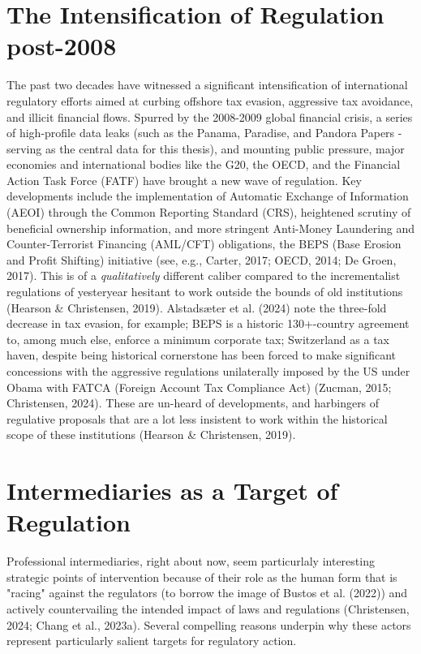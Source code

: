 \section{The Intensification of Regulation post-2008}
\label{sec:1_3}

The past two decades have witnessed a significant intensification of international regulatory efforts aimed at curbing offshore tax evasion, aggressive tax avoidance, and illicit financial flows. Spurred by the 2008-2009 global financial crisis, a series of high-profile data leaks (such as the Panama, Paradise, and Pandora Papers - serving as the central data for this thesis), and mounting public pressure, major economies and international bodies like the G20, the OECD, and the Financial Action Task Force (FATF) have brought a new wave of regulation.
Key developments include the implementation of Automatic Exchange of Information (AEOI) through the Common Reporting Standard (CRS), heightened scrutiny of beneficial ownership information, and more stringent Anti-Money Laundering and Counter-Terrorist Financing (AML/CFT) obligations, the BEPS (Base Erosion and Profit Shifting) initiative (see, e.g., Carter, 2017; OECD, 2014; De Groen, 2017). This is of a \textit{qualitatively} different caliber compared to the incrementalist regulations of yesteryear hesitant to work outside the bounds of old institutions (Hearson \& Christensen, 2019).  Alstadsæter et al. (2024) note the three-fold decrease in tax evasion, for example; BEPS is a historic 130+-country agreement to, among much else, enforce a minimum corporate tax; Switzerland as a tax haven, despite being historical cornerstone  has been forced to make significant concessions with the aggressive regulations unilaterally imposed by the US under Obama with FATCA (Foreign Account Tax Compliance Act) (Zucman, 2015; Christensen, 2024). These are un-heard of developments, and harbingers of regulative proposals that are a lot less insistent to work within the historical scope of these institutions (Hearson \& Christensen, 2019).

\section{Intermediaries as a Target of Regulation}
\label{sec:1_3}

Professional intermediaries, right about now, seem particurlaly interesting strategic points of intervention because of their role as the human form that is "racing" against the regulators (to borrow the image of Bustos et al. (2022)) and actively countervailing the intended impact of laws and regulations (Christensen, 2024; Chang et al., 2023a). Several compelling reasons underpin why these actors represent particularly salient targets for regulatory action. 

